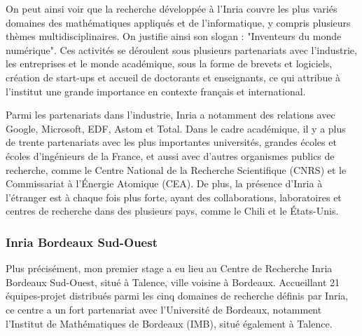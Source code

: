 \indent On peut ainsi voir que la recherche développée à l'Inria couvre les plus variés domaines des mathématiques appliqués et de l'informatique, y compris plusieurs thèmes multidisciplinaires. On justifie ainsi son slogan : "Inventeurs du monde numérique". Ces activités se déroulent sous plusieurs partenariats avec l'industrie, les entreprises et le monde académique, sous la forme de brevets et logiciels, création de start-ups et accueil de doctorants et enseignants, ce qui attribue à l'institut une grande importance en contexte français et international.

\indent Parmi les partenariats dans l'industrie, Inria a notamment des relations avec Google, Microsoft, EDF, Astom et Total. Dans le cadre académique, il y a plus de trente partenariats avec les plus importantes universités, grandes écoles et écoles d'ingénieurs de la France, et aussi avec d'autres organismes publics de recherche, comme le Centre National de la Recherche Scientifique (CNRS) et le Commissariat à l'Énergie Atomique (CEA). De plus, la présence d'Inria à l'étranger est à chaque fois plus forte, ayant des collaborations, laboratoires et centres de recherche dans des plusieurs pays, comme le Chili et le États-Unis.


\subsubsection{Inria Bordeaux Sud-Ouest}

\indent Plus précisément, mon premier stage a eu lieu au Centre de Recherche Inria Bordeaux Sud-Ouest, situé à Talence, ville voisine à Bordeaux. Accueillant 21 équipes-projet distribués parmi les cinq domaines de recherche définis par Inria, ce centre a un fort partenariat avec l'Université de Bordeaux, notamment l'Institut de Mathématiques de Bordeaux (IMB), situé également à Talence.

